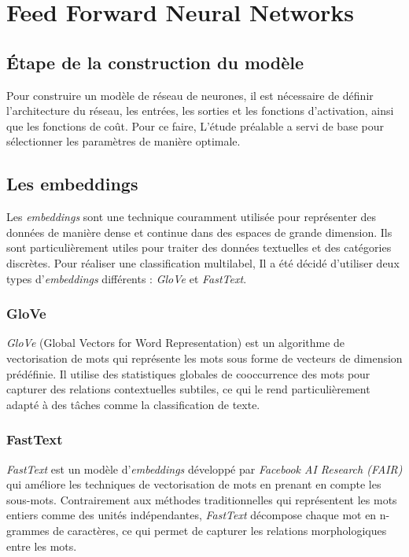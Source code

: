\chapter{Feed Forward Neural Networks}

\section{Étape de la construction du modèle}

Pour construire un modèle de réseau de neurones, il est nécessaire de définir l'architecture du réseau, les entrées, les sorties et les fonctions d'activation, ainsi que les fonctions de coût. 
Pour ce faire, L'étude préalable a servi de base pour sélectionner les paramètres de manière optimale.

\section{Les embeddings}

Les \textit{embeddings} sont une technique couramment utilisée pour représenter des données de manière dense et continue dans des espaces de grande dimension. 
Ils sont particulièrement utiles pour traiter des données textuelles et des catégories discrètes.
Pour réaliser une classification multilabel, Il a été décidé d'utiliser deux types d'\textit{embeddings} différents : \textit{GloVe} et \textit{FastText}.

\subsection{GloVe}

\textit{GloVe} (Global Vectors for Word Representation) est un algorithme de vectorisation de mots qui représente les mots sous forme de vecteurs de dimension prédéfinie. 
Il utilise des statistiques globales de cooccurrence des mots pour capturer des relations contextuelles subtiles, ce qui le rend particulièrement adapté à des tâches comme la classification de texte.

\subsection{FastText}

\textit{FastText} est un modèle d'\textit{embeddings} développé par \textit{Facebook AI Research (FAIR)} qui améliore les techniques de vectorisation de mots en prenant en compte les sous-mots. 
Contrairement aux méthodes traditionnelles qui représentent les mots entiers comme des unités indépendantes, \textit{FastText} décompose chaque mot en n-grammes de caractères, ce qui permet de capturer les relations morphologiques entre les mots.



